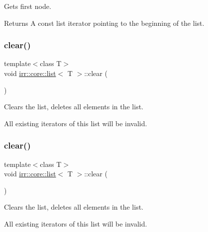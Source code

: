 Gets first node. 

\begin{DoxyReturn}{Returns}
A const list iterator pointing to the beginning of the list. 
\end{DoxyReturn}
\mbox{\label{classirr_1_1core_1_1list_aad18996ed41454bf7bb8e1d3199f4e73}} 
\subsubsection{\texorpdfstring{clear()}{clear()}\hspace{0.1cm}{\footnotesize\ttfamily [1/2]}}
{\footnotesize\ttfamily template$<$class T$>$ \\
void \hyperlink{classirr_1_1core_1_1list}{irr\+::core\+::list}$<$ T $>$\+::clear (\begin{DoxyParamCaption}{ }\end{DoxyParamCaption})\hspace{0.3cm}{\ttfamily [inline]}}



Clears the list, deletes all elements in the list. 

All existing iterators of this list will be invalid. \mbox{\label{classirr_1_1core_1_1list_aad18996ed41454bf7bb8e1d3199f4e73}} 
\subsubsection{\texorpdfstring{clear()}{clear()}\hspace{0.1cm}{\footnotesize\ttfamily [2/2]}}
{\footnotesize\ttfamily template$<$class T$>$ \\
void \hyperlink{classirr_1_1core_1_1list}{irr\+::core\+::list}$<$ T $>$\+::clear (\begin{DoxyParamCaption}{ }\end{DoxyParamCaption})\hspace{0.3cm}{\ttfamily [inline]}}



Clears the list, deletes all elements in the list. 

All existing iterators of this list will be invalid. \mbox{\label{classirr_1_1core_1_1list_aa0958447b2269fff0d650cb464ba84bd}} 
